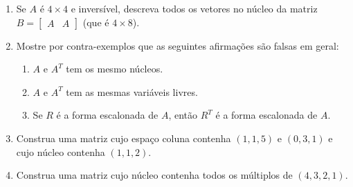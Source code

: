 \documentclass[leqno]{article}
\numberwithin{equation}{section}
\begin{document}
\begin{enumerate}
    \item Se $A$ é $4\times 4$ e inversível, descreva todos os vetores no núcleo da matriz $B = \begin{bmatrix}A & A \end{bmatrix}$ (que é $4\times 8$).
    
    \begin{sol} 
    \end{sol} 

    \item Mostre por contra-exemplos que as seguintes afirmações são falsas em geral:

        \begin{enumerate}

            \item $A$ e $A^T$ tem os mesmo núcleos.
	    
	    \begin{sol} 
	    \end{sol} 

            \item $A$ e $A^T$ tem as mesmas variáveis livres.
	    
	    \begin{sol} 
	    \end{sol} 

            \item Se $R$ é a forma escalonada de $A$, então $R^T$ é a forma escalonada de $A$.
	    
	    \begin{sol} 
	    \end{sol} 
        \end{enumerate}

    \item Construa uma matriz cujo espaço coluna contenha $(1,1,5)$ e $(0,3,1)$ e cujo núcleo contenha $(1,1,2)$.

    \begin{sol} 
    \end{sol} 

    \item Construa uma matriz cujo núcleo contenha todos os múltiplos de $(4,3,2,1)$.
    
    \begin{sol} 
    \end{sol} 


\end{enumerate}
\end{document}

